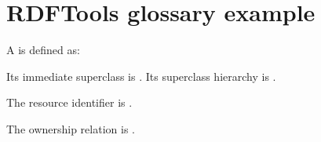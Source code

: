 \documentclass{article}
\begin{document}
\section*{RDFTools glossary example}
A  is defined as:

Its immediate superclass is .
Its superclass hierarchy is .

The resource identifier is .

The ownership relation is .

\printnoidxglossary[title={RDF Terms}]
\end{document}
